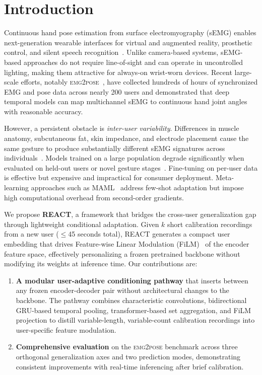 \documentclass[conference]{IEEEtran}
\begin{document}
\section{Introduction}
\label{sec:intro}

Continuous hand pose estimation from surface electromyography (sEMG) enables next-generation wearable interfaces for virtual and augmented reality, prosthetic control, and silent speech recognition~\cite{salter2024emg2pose, ctrlabs2024generic}. Unlike camera-based systems, sEMG-based approaches do not require line-of-sight and can operate in uncontrolled lighting, making them attractive for always-on wrist-worn devices. Recent large-scale efforts, notably \textsc{emg2pose}~\cite{salter2024emg2pose}, have collected hundreds of hours of synchronized EMG and pose data across nearly 200 users and demonstrated that deep temporal models can map multichannel sEMG to continuous hand joint angles with reasonable accuracy.

However, a persistent obstacle is \emph{inter-user variability}. Differences in muscle anatomy, subcutaneous fat, skin impedance, and electrode placement cause the same gesture to produce substantially different sEMG signatures across individuals~\cite{atzori2016electromyography, phinyomark2018feature}. Models trained on a large population degrade significantly when evaluated on held-out users or novel gesture stages~\cite{salter2024emg2pose}. Fine-tuning on per-user data is effective but expensive and impractical for consumer deployment. Meta-learning approaches such as MAML~\cite{finn2017maml} address few-shot adaptation but impose high computational overhead from second-order gradients.

We propose \textbf{REACT}, a framework that bridges the cross-user generalization gap through lightweight conditional adaptation. Given $k$ short calibration recordings from a new user ($\leq$45 seconds total), REACT generates a compact user embedding that drives Feature-wise Linear Modulation (FiLM)~\cite{perez2018film} of the encoder feature space, effectively personalizing a frozen pretrained backbone without modifying its weights at inference time. Our contributions are:

\begin{enumerate}[leftmargin=*,itemsep=2pt,topsep=2pt]
    \item \textbf{A modular user-adaptive conditioning pathway} that inserts between any frozen encoder-decoder pair without architectural changes to the backbone. The pathway combines characteristic convolutions, bidirectional GRU-based temporal pooling, transformer-based set aggregation, and FiLM projection to distill variable-length, variable-count calibration recordings into user-specific feature modulation.
    \item \textbf{Comprehensive evaluation} on the \textsc{emg2pose} benchmark across three orthogonal generalization axes and two prediction modes, demonstrating consistent improvements with real-time inferencing after brief calibration.
\end{enumerate}
\end{document}
